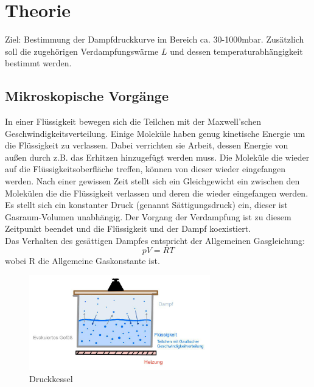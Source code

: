 \newpage
\section{Theorie}
\label{sec:theorie}
Ziel: Bestimmung der Dampfdruckkurve im Bereich ca. 30-1000mbar.
Zusätzlich soll die zugehörigen Verdampfungswärme $L$ und dessen temperaturabhängigkeit bestimmt werden.\\

\subsection{Mikroskopische Vorgänge}
In einer Flüssigkeit bewegen sich die Teilchen mit der Maxwell'schen Geschwindigkeitsverteilung.
Einige Moleküle haben genug kinetische Energie um die Flüssigkeit zu verlassen.
Dabei verrichten sie Arbeit, dessen Energie von außen durch z.B. das Erhitzen hinzugefügt werden muss.
Die Moleküle die wieder auf die Flüssigkeitsoberfläche treffen, können von dieser wieder eingefangen werden.
Nach einer gewissen Zeit stellt sich ein Gleichgewicht ein zwischen den Molekülen die die Flüssigkeit verlassen und deren
die wieder eingefangen werden.
Es stellt sich ein konstanter Druck (genannt Sättigungsdruck) ein, dieser ist Gasraum-Volumen unabhängig. 
Der Vorgang der Verdampfung ist zu diesem Zeitpunkt beendet und
die Flüssigkeit und der Dampf koexistiert.\\
Das Verhalten des gesättigen Dampfes entspricht der Allgemeinen Gasgleichung:
\begin{equation}
    pV=RT
    \label{eqn:gasgl}
\end{equation}
wobei R die Allgemeine Gaskonstante ist.

\begin{figure}
    \centering
    \includegraphics[width=0.7\textwidth]{bilder/kessel.jpg}
    \caption{Druckkessel}
    \label{fig:kessel}
\end{figure}

